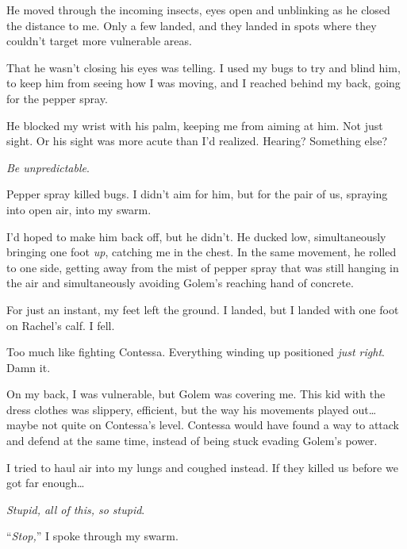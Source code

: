 He moved through the incoming insects, eyes open and unblinking as he closed the distance to me.  Only a few landed, and they landed in spots where they couldn't target more vulnerable areas.



That he wasn't closing his eyes was telling.  I used my bugs to try and blind him, to keep him from seeing how I was moving, and I reached behind my back, going for the pepper spray.



He blocked my wrist with his palm, keeping me from aiming at him.  Not just sight.  Or his sight was more acute than I'd realized.  Hearing?  Something else?



\emph{Be unpredictable}.



Pepper spray killed bugs.  I didn't aim for him, but for the pair of us, spraying into open air, into my swarm.



I'd hoped to make him back off, but he didn't.  He ducked low, simultaneously bringing one foot \emph{up}, catching me in the chest.  In the same movement, he rolled to one side, getting away from the mist of pepper spray that was still hanging in the air and simultaneously avoiding Golem's reaching hand of concrete.



For just an instant, my feet left the ground.  I landed, but I landed with one foot on Rachel's calf.  I fell.



Too much like fighting Contessa.  Everything winding up positioned \emph{just right}.  Damn it.



On my back, I was vulnerable, but Golem was covering me.  This kid with the dress clothes was slippery, efficient, but the way his movements played out\ldots maybe not quite on Contessa's level.  Contessa would have found a way to attack and defend at the same time, instead of being stuck evading Golem's power.



I tried to haul air into my lungs and coughed instead.  If they killed us before we got far enough\ldots



\emph{Stupid, all of this, so stupid}.



``\emph{Stop,}'' I spoke through my swarm.




